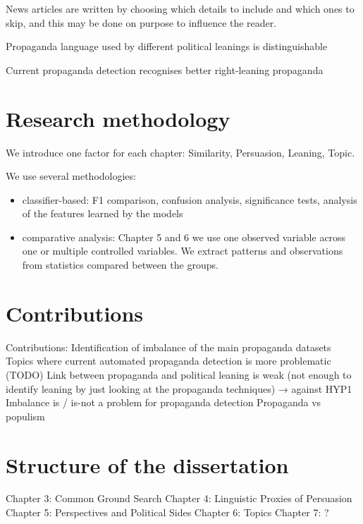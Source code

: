 News articles are written by choosing which details to include and which ones to skip, and this may be done on purpose to influence the reader.

Propaganda language used by different political leanings is distinguishable

Current propaganda detection recognises better right-leaning propaganda

\section{Research methodology}
\label{sec:intro_method}

We introduce one factor for each chapter: Similarity, Persuasion, Leaning, Topic.

We use several methodologies:
\begin{itemize}
    \item classifier-based: F1 comparison, confusion analysis, significance tests, analysis of the features learned by the models 
    \item comparative analysis: Chapter 5 and 6 we use one observed variable across one or multiple controlled variables. We extract patterns and observations from statistics compared between the groups.
\end{itemize}


\section{Contributions}
\label{sec:intro_contributions}

Contributions:
Identification of imbalance of the main propaganda datasets
Topics where current automated propaganda detection is more problematic (TODO) 
Link between propaganda and political leaning is weak (not enough to identify leaning by just looking at the propaganda techniques) → against HYP1
Imbalance is / is-not a problem for propaganda detection
Propaganda vs populism

\section{Structure of the dissertation}
\label{sec:intro_structure}

Chapter 3: Common Ground Search
Chapter 4: Linguistic Proxies of Persuasion
Chapter 5: Perspectives and Political Sides
Chapter 6: Topics
Chapter 7: ?

